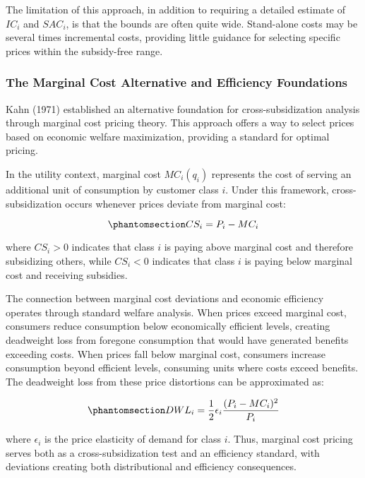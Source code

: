 \documentclass[
  11pt,
]{article}
\begin{document}
The limitation of this approach, in addition to requiring a detailed
estimate of \(IC_i\) and \(SAC_i\), is that the bounds are often quite
wide. Stand-alone costs may be several times incremental costs,
providing little guidance for selecting specific prices within the
subsidy-free range.

\subsubsection{The Marginal Cost Alternative and Efficiency
Foundations}\label{the-marginal-cost-alternative-and-efficiency-foundations}

Kahn (1971) established an alternative foundation for
cross-subsidization analysis through marginal cost pricing theory. This
approach offers a way to select prices based on economic welfare
maximization, providing a standard for optimal pricing.

In the utility context, marginal cost \(MC_i(q_i)\) represents the cost
of serving an additional unit of consumption by customer class \(i\).
Under this framework, cross-subsidization occurs whenever prices deviate
from marginal cost:

\begin{equation}\phantomsection\label{eq-marginal-cs}{CS_i = P_i - MC_i}\end{equation}

where \(CS_i > 0\) indicates that class \(i\) is paying above marginal
cost and therefore subsidizing others, while \(CS_i < 0\) indicates that
class \(i\) is paying below marginal cost and receiving subsidies.

The connection between marginal cost deviations and economic efficiency
operates through standard welfare analysis. When prices exceed marginal
cost, consumers reduce consumption below economically efficient levels,
creating deadweight loss from foregone consumption that would have
generated benefits exceeding costs. When prices fall below marginal
cost, consumers increase consumption beyond efficient levels, consuming
units where costs exceed benefits. The deadweight loss from these price
distortions can be approximated as:

\begin{equation}\phantomsection\label{eq-dwl}{DWL_i = \frac{1}{2} \epsilon_i \frac{(P_i - MC_i)^2}{P_i}}\end{equation}

where \(\epsilon_i\) is the price elasticity of demand for class \(i\).
Thus, marginal cost pricing serves both as a cross-subsidization test
and an efficiency standard, with deviations creating both distributional
and efficiency consequences.
\end{document}
